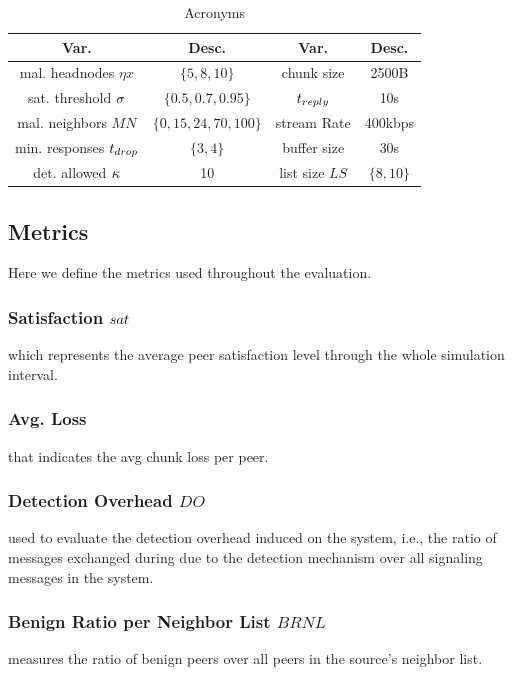 \begin{table}[ht]
\center
\caption{Acronyms}
\begin{tabular}{|c|c||c|c|}
\hline

\bf{Var.} & \bf{Desc.}  & \bf{Var.} & \bf{Desc.} \\\hline\hline

mal. headnodes $\eta x$ & $\{5,8,10\}$ & chunk size & 2500B \\\hline
sat. threshold $\sigma$ & $\{0.5,0.7,0.95\}$ & $t_{reply}$ & 10s\\\hline
mal. neighbors $MN$  & $\{0,15,24,70,100\}$ & stream Rate & 400kbps\\\hline
min. responses $t_{drop}$ &  $\{3,4\}$ & buffer size & 30s  \\\hline
det. allowed $\kappa$ & 10 & list size $LS$ & $\{8,10\}$\\\hline
  
\end{tabular}
\label{tab:parameters}
\end{table}
\vspace{-2.5mm}
\subsection{Metrics}

Here we define the metrics used throughout the evaluation.
\subsubsection*{Satisfaction $sat$} which represents the average peer satisfaction level through the whole simulation interval.
\subsubsection*{Avg. Loss} that indicates the avg chunk loss per peer.
\subsubsection*{Detection Overhead $DO$} used to evaluate the detection overhead induced on the system, i.e., the ratio of messages exchanged during due to the detection mechanism over all signaling messages in the system.
\subsubsection*{Benign Ratio per Neighbor List $BRNL$} measures the ratio of benign peers over all peers in the source's neighbor list.

